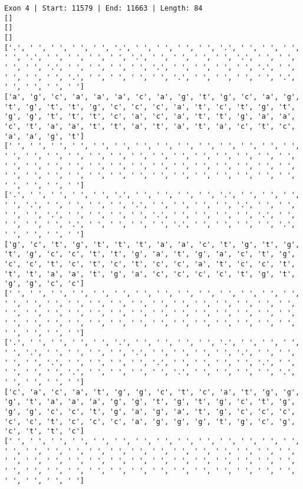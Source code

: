 \documentclass{article}
\begin{document}
\begin{Verbatim}
Exon 4 | Start: 11579 | End: 11663 | Length: 84
[]
[]
[]
['.', ' ', ' ', ' ', ' ', '.', ' ', ' ', ' ', ' ', '.', ' ', ' ', ' ', ' ', '.', ' ', ' ', ' ', ' ', '.', ' ', ' ', ' ', ' ', '.', ' ', ' ', ' ', ' ', '.', ' ', ' ', ' ', ' ', '.', ' ', ' ', ' ', ' ', '.', ' ', ' ', ' ', ' ', '.', ' ', ' ', ' ', ' ', '.', ' ', ' ', ' ', ' ', '.', ' ', ' ', ' ', ' ']
['a', 'g', 'c', 'a', 'a', 'a', 'c', 'a', 'g', 't', 'g', 'c', 'a', 'g', 't', 'g', 't', 't', 'g', 'c', 'c', 'c', 'a', 't', 'c', 't', 'g', 't', 'g', 'g', 't', 't', 't', 'c', 'a', 'c', 'a', 't', 't', 'g', 'a', 'a', 'c', 't', 'a', 'a', 't', 't', 'a', 't', 'a', 't', 'a', 'c', 't', 'c', 'a', 'a', 'g', 't']
[' ', ' ', ' ', ' ', ' ', ' ', ' ', ' ', ' ', ' ', ' ', ' ', ' ', ' ', ' ', ' ', ' ', ' ', ' ', ' ', ' ', ' ', ' ', ' ', ' ', ' ', ' ', ' ', ' ', ' ', ' ', ' ', ' ', ' ', ' ', ' ', ' ', ' ', ' ', ' ', ' ', ' ', ' ', ' ', ' ', ' ', ' ', ' ', ' ', ' ', ' ', ' ', ' ', ' ', ' ', ' ', ' ', ' ', ' ', ' ']
['.', ' ', ' ', ' ', ' ', '.', ' ', ' ', ' ', ' ', '.', ' ', ' ', ' ', ' ', '.', ' ', ' ', ' ', ' ', '.', ' ', ' ', ' ', ' ', '.', ' ', ' ', ' ', ' ', '.', ' ', ' ', ' ', ' ', '.', ' ', ' ', ' ', ' ', '.', ' ', ' ', ' ', ' ', '.', ' ', ' ', ' ', ' ', '.', ' ', ' ', ' ', ' ', '.', ' ', ' ', ' ', ' ']
['g', 'c', 't', 'g', 't', 't', 't', 'a', 'a', 'c', 't', 'g', 't', 'g', 't', 'g', 'c', 'c', 't', 't', 'g', 'a', 't', 'g', 'a', 'c', 't', 'g', 'c', 'c', 't', 'c', 't', 'c', 't', 'c', 'c', 'a', 't', 'c', 'c', 't', 't', 't', 'a', 'a', 't', 'g', 'a', 'c', 'c', 'c', 'c', 't', 'g', 't', 'g', 'g', 'c', 'c']
[' ', ' ', ' ', ' ', ' ', ' ', ' ', ' ', ' ', ' ', ' ', ' ', ' ', ' ', ' ', ' ', ' ', ' ', ' ', ' ', ' ', ' ', ' ', ' ', ' ', ' ', ' ', ' ', ' ', ' ', ' ', ' ', ' ', ' ', ' ', ' ', ' ', ' ', ' ', ' ', ' ', ' ', ' ', ' ', ' ', ' ', ' ', ' ', ' ', ' ', ' ', ' ', ' ', ' ', ' ', ' ', ' ', ' ', ' ', ' ']
['.', ' ', ' ', ' ', ' ', '.', ' ', ' ', ' ', ' ', '.', ' ', ' ', ' ', ' ', '.', ' ', ' ', ' ', ' ', '.', ' ', ' ', ' ', ' ', '.', ' ', ' ', ' ', ' ', '.', ' ', ' ', ' ', ' ', '.', ' ', ' ', ' ', ' ', '.', ' ', ' ', ' ', ' ', '.', ' ', ' ', ' ', ' ', '.', ' ', ' ', ' ', ' ', '.', ' ', ' ', ' ', ' ']
['c', 'a', 'c', 'a', 't', 'g', 'g', 'c', 't', 'c', 'a', 't', 'g', 'g', 'g', 't', 'a', 'a', 'a', 'g', 'g', 't', 'g', 't', 'g', 'c', 't', 'g', 'g', 'g', 'c', 'c', 't', 'g', 'a', 'g', 'a', 't', 'g', 'c', 'c', 'c', 'c', 'c', 't', 'c', 'c', 'c', 'a', 'g', 'g', 'g', 't', 'g', 'c', 'g', 'c', 't', 't', 'c']
[' ', ' ', ' ', ' ', ' ', ' ', ' ', ' ', ' ', ' ', ' ', ' ', ' ', ' ', ' ', ' ', ' ', ' ', ' ', ' ', ' ', ' ', ' ', ' ', ' ', ' ', ' ', ' ', ' ', ' ', ' ', ' ', ' ', ' ', ' ', ' ', ' ', ' ', ' ', ' ', ' ', ' ', ' ', ' ', ' ', ' ', ' ', ' ', ' ', ' ', ' ', ' ', ' ', ' ', ' ', ' ', ' ', ' ', ' ', ' ']

\end{Verbatim}
\end{document}
